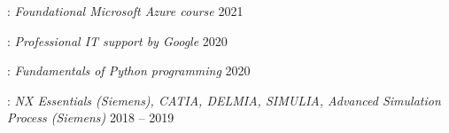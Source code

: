






: \textit{Foundational Microsoft Azure course} \hfill 2021

: \textit{Professional IT support by Google} \hfill 2020

: \textit{Fundamentals of Python programming} \hfill 2020

: \textit{NX Essentials (Siemens), CATIA, DELMIA, SIMULIA, Advanced Simulation Process (Siemens)} \hfill 2018 -- 2019